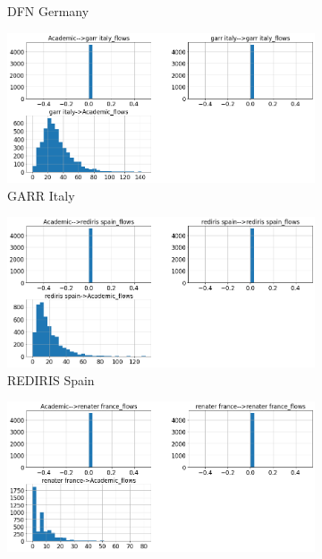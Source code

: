 \documentclass[10pt, journal, letterpaper]{IEEEtran}
\newcommand\histFigSze{0.48}
\begin{document}
\begin{figure}
\begin{subfigure}{\histFigSze\textwidth}
          \caption{DFN Germany}
          \label{fig:dfn_hist_fps}
    \end{subfigure}
    \begin{subfigure}{\histFigSze\textwidth}
          \centering
          \includegraphics[width=\columnwidth]{img/garr_hist_fps.png}
          \caption{GARR Italy}
          \label{fig:garr_hist_fps}
    \end{subfigure}
    \begin{subfigure}{\histFigSze\textwidth}
          \centering
          \includegraphics[width=\columnwidth]{img/rediris_hist_fps.png}
          \caption{REDIRIS Spain}
          \label{fig:rediris_hist_fps}
    \end{subfigure}
    \begin{subfigure}{\histFigSze\textwidth}
          \centering
          \includegraphics[width=\columnwidth]{img/renater_hist_fps.png}

\end{subfigure}
\end{figure}
\end{document}
